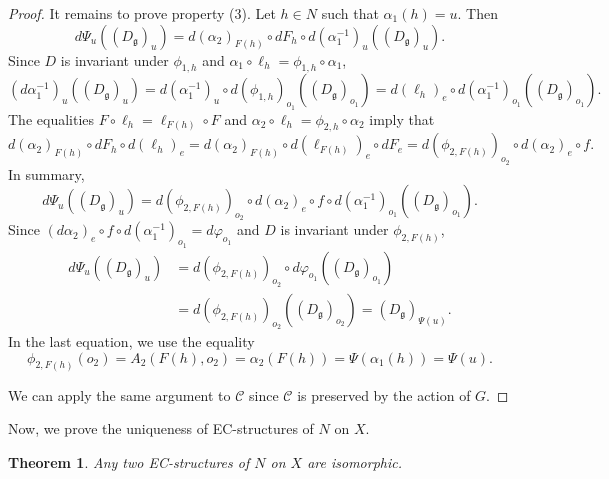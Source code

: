 \documentclass{amsart}
\newtheorem{theorem}{Theorem}
\theoremstyle{definition}
\theoremstyle{remark}
\newcommand{\g}{\mathfrak{g}}
\begin{document}
\begin{proof}
It remains to prove property (3). Let $h \in N$ such that $\alpha_1(h) = u$. Then 
\[d\Psi_u ((D_\g)_u) = d(\alpha_2)_{F(h)} \circ dF_{h} \circ d(\alpha^{-1}_1)_u ((D_\g)_u).\]
Since $D$ is invariant under $\phi_{1, h}$ and $\alpha_1 \circ \ell_h = \phi_{1,h} \circ \alpha_1$, 
\[(d\alpha_1^{-1})_u ((D_\g)_u) = d(\alpha^{-1}_1)_u \circ d(\phi_{1, h})_{o_1} ((D_\g)_{o_1}) = d(\ell_h)_e \circ d(\alpha_1^{-1})_{o_1} ((D_\g)_{o_1}).\]
The equalities $F \circ \ell_h = \ell_{F(h)} \circ F$ and $\alpha_2 \circ \ell_h = \phi_{2,h} \circ \alpha_2$ imply that 
\[d(\alpha_2)_{F(h)} \circ dF_{h} \circ d(\ell_h)_e =  d(\alpha_2)_{F(h)} \circ d(\ell_{F(h)})_e \circ dF_{e} =  d(\phi_{2,F(h)})_{o_2} \circ d(\alpha_2)_{e} \circ f.\]
In summary,
\[d\Psi_u ((D_\g)_u) = d(\phi_{2,F(h)})_{o_2} \circ d(\alpha_2)_{e} \circ f \circ d(\alpha_1^{-1})_{o_1} ((D_\g)_{o_1}).\]
Since $(d\alpha_2)_e \circ f \circ d(\alpha_1^{-1})_{o_1} = d\varphi_{o_1}$ and $D$ is invariant under $\phi_{2, F(h)}$,
\begin{align*}
d\Psi_u((D_\g)_u)&= d(\phi_{2,F(h)})_{o_2}\circ d\varphi_{o_1} ((D_\g)_{o_1})\\
&= d(\phi_{2,F(h)})_{o_2}((D_\g)_{o_2}) = (D_\g)_{\Psi(u)}.
\end{align*}
In the last equation, we use the equality 
\[\phi_{2, F(h)}(o_2) = A_2(F(h), o_2) = \alpha_2(F(h)) = \Psi(\alpha_1(h)) = \Psi(u).\]

We can apply the same argument to $\mathscr{C}$ since $\mathscr{C}$ is preserved by the action of $G$.
\end{proof}


Now, we prove the uniqueness of EC-structures of $N$ on $X$.

\begin{theorem}
\label{uniqueness}
Any two EC-structures of \(N\) on \(X\) are isomorphic.
\end{theorem}
\end{document}
